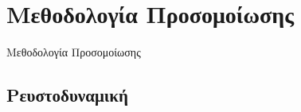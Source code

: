 \documentclass[8pt,sans,mathserif,aspectratio=43]{beamer}
\begin{document}
\section{Μεθοδολογία Προσομοίωσης}

\begin{frame}
  \begin{center}
    Μεθοδολογία Προσομοίωσης
  \end{center}
\end{frame}


\subsection{Ρευστοδυναμική}
\end{document}
